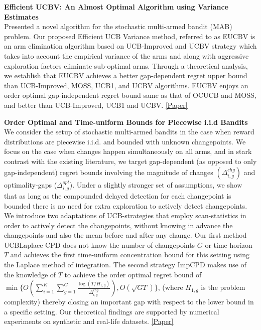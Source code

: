 \documentclass[margin,11pt]{res}
\begin{document}
\begin{resume}
\textbf{Efficient UCBV: An Almost Optimal Algorithm using Variance Estimates}\\
Presented a novel algorithm for the stochastic multi-armed bandit (MAB) problem. Our proposed Efficient UCB Variance method, referred to as EUCBV is an arm elimination algorithm based on UCB-Improved and UCBV strategy which takes into account the empirical variance of the arms and along with aggressive exploration factors eliminate sub-optimal arms. Through a theoretical analysis, we establish that EUCBV achieves a better gap-dependent regret upper bound than UCB-Improved, MOSS, UCB1, and UCBV algorithms. EUCBV enjoys an order optimal gap-independent regret bound same as that of OCUCB and MOSS, and better than UCB-Improved, UCB1 and UCBV. \href{https://www.aaai.org/ocs/index.php/AAAI/AAAI18/paper/view/16111}{[Paper]}
\par

\textbf{Order Optimal and Time-uniform Bounds for Piecewise i.i.d Bandits}\\
We consider the setup of stochastic multi-armed bandits in the case when reward distributions are piecewise i.i.d. and bounded with unknown changepoints. We focus on the case when changes happen simultaneously on all arms, and in stark contrast with the existing literature, we target gap-dependent (as opposed to only gap-independent) regret bounds involving the magnitude of changes $(\Delta^{chg}_{i,g})$ and optimality-gaps ($\Delta^{opt}_{i,g}$). Under a slightly stronger set of assumptions, we show that as long as the compounded delayed detection for each changepoint is bounded there is no need for extra exploration to actively detect changepoints. We introduce two adaptations of UCB-strategies that employ scan-statistics in order to actively detect the changepoints, without knowing in advance the changepoints and also the mean before and after any change. Our first method UCBLaplace-CPD does not know the number of changepoints $G$ or time horizon $T$ and achieves the first time-uniform concentration bound for this setting using the Laplace method of integration. The second strategy ImpCPD makes use of the knowledge of $T$ to achieve the order optimal regret bound of $\min\big\lbrace O(\sum_{i=1}^{K} \sum_{g=1}^{G}\frac{\log(T/H_{1,g})}{\Delta^{chg}_{i,g}}), O(\sqrt{GT})\big\rbrace$, (where $H_{1,g}$ is the problem complexity) thereby closing an important gap with respect to the lower bound in a specific setting. Our theoretical findings are supported by numerical experiments on synthetic and real-life datasets. \href{https://github.com/Subhojyoti/INRIA_Intern/blob/master/ICML2019/paper.pdf}{[Paper]}


\end{resume}
\end{document}
